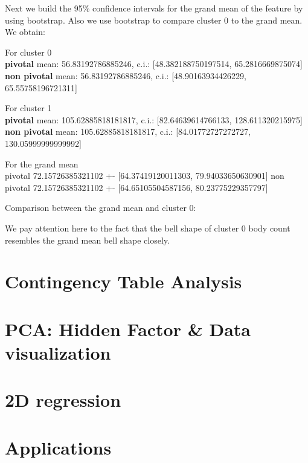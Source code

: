 \documentclass[a4paper,14pt]{article}
\begin{document}
\normalsize


Next we build the 95\% confidence intervals for the grand mean of the feature by using bootstrap. Also we use bootstrap to compare cluster 0 to the grand mean.  We obtain:

\footnotesize
For cluster 0 \\
\textbf{pivotal} mean: 56.83192786885246, c.i.: [48.382188750197514, 65.2816669875074] \\
\textbf{non pivotal} mean: 56.83192786885246, c.i.: [48.90163934426229, 65.55758196721311]

For cluster 1 \\
\textbf{pivotal} mean:  105.62885818181817, c.i.:  [82.64639614766133, 128.611320215975] \\
\textbf{non pivotal} mean:  105.62885818181817, c.i.:  [84.01772727272727, 130.05999999999992]

For the grand mean \\
pivotal 72.15726385321102 +- [64.37419120011303, 79.94033650630901]
non pivotal 72.15726385321102 +- [64.65105504587156, 80.23775229357797]

\normalsize

Comparison between the grand mean and cluster 0:
    \begin{center}
\end{center}
We pay attention here to the fact that the bell shape of cluster 0 body count resembles the grand mean bell shape closely.
    \begin{center}
\end{center}


    \section{Contingency Table Analysis}
    \section{PCA: Hidden Factor \& Data visualization}
    \section{2D regression}
    
    \section{Applications}
    
\end{document}
